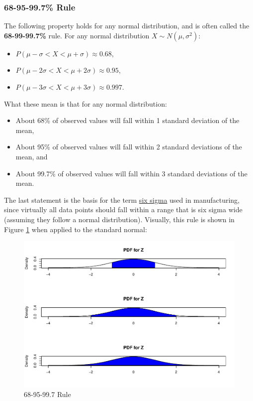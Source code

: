 \documentclass[
]{book}
\providecommand{\tightlist}{%
  \setlength{\itemsep}{0pt}\setlength{\parskip}{0pt}}
\begin{document}
\hypertarget{rulenorm}{%
\subsubsection{68-95-99.7\% Rule}\label{rulenorm}}

The following property holds for any normal distribution, and is often called the \textbf{68-99-99.7\%} rule. For any normal distribution \(X \sim N(\mu, \sigma^2)\):

\begin{itemize}
\tightlist
\item
  \(P(\mu - \sigma < X < \mu + \sigma) \approx 0.68\),
\item
  \(P(\mu - 2\sigma < X < \mu + 2\sigma) \approx 0.95\),
\item
  \(P(\mu - 3\sigma < X < \mu + 3\sigma) \approx 0.997\).
\end{itemize}

What these mean is that for any normal distribution:

\begin{itemize}
\tightlist
\item
  About 68\% of observed values will fall within 1 standard deviation of the mean,
\item
  About 95\% of observed values will fall within 2 standard deviations of the mean, and
\item
  About 99.7\% of observed values will fall within 3 standard deviations of the mean.
\end{itemize}

The last statement is the basis for the term \href{https://en.wikipedia.org/wiki/Six_Sigma}{six sigma} used in manufacturing, since virtually all data points should fall within a range that is six sigma wide (assuming they follow a normal distribution). Visually, this rule is shown in Figure \ref{fig:4-rule} when applied to the standard normal:

\begin{figure}
\centering
\includegraphics{bookdown-demo_files/figure-latex/4-rule-1.pdf}
\caption{\label{fig:4-rule}68-95-99.7 Rule}
\end{figure}
\end{document}
